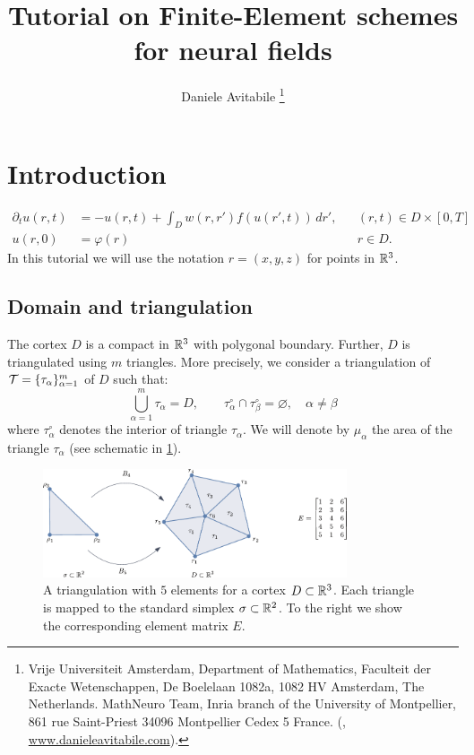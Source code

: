 \documentclass[a4paper]{siamonline220329}
\title{Tutorial on Finite-Element schemes for neural fields}
\author{ Daniele Avitabile
\thanks{ Vrije Universiteit Amsterdam, Department of
  Mathematics, Faculteit der Exacte Wetenschappen, De Boelelaan 1082a, 1082 HV
  Amsterdam, The Netherlands. \protect MathNeuro Team, Inria branch of the University
  of Montpellier, 861 rue Saint-Priest 34096 Montpellier Cedex 5 France. \protect
(\email{d.avitabile@vu.nl}, \url{www.danieleavitabile.com}). }
}
\theoremstyle{plain}
\renewcommand\phi\varphi
\begin{document}
\maketitle



\section{Introduction}\label{sec:introduction} 

\begin{equation}\label{eq:NF}
  \begin{aligned}
    \partial_{t} u(r,t) & = -u(r,t) + \int_{D} w(r,r') f(u(r',t))\,d r',
      && (r,t) \in D \times [0,T] \\
    u(r,0) & = \phi(r)
      && r \in D.
  \end{aligned}
\end{equation}
In this tutorial we will use the notation $r=(x,y,z)$ for points in $\mathbb{R}^3$.
\subsection{Domain and triangulation} \label{ssec:triangulation}
The cortex $D$ is a compact in $\mathbb{R}^3$ with
polygonal boundary. Further, $D$ is triangulated using $m$ triangles. More precisely,
we consider a triangulation of $\mathcal{T} = \{ \tau_\alpha \}_{\alpha = 1}^m$ of $D$ such
that: \[ \bigcup_{\alpha=1}^m \tau_\alpha = D, \qquad \tau_\alpha^\circ \cap
\tau_\beta^\circ = \varnothing, \quad \alpha \neq \beta \] where $\tau_\alpha^\circ$
denotes the interior of triangle $\tau_{\alpha}$. We will denote by $\mu_\alpha$ the
area of the triangle $\tau_\alpha$ (see schematic in \cref{fig:triangulation}).

\begin{figure}
  \centering
  \includegraphics[width = 0.8\textwidth]{triangulation}
  \caption{A triangulation with $5$ elements for a cortex $D \subset \mathbb{R}^3$. Each
  triangle is mapped to the standard simplex $\sigma \subset \mathbb{R}^2$. To the right
we show the corresponding element matrix $E$.}
  \label{fig:triangulation}
\end{figure}
\end{document}
